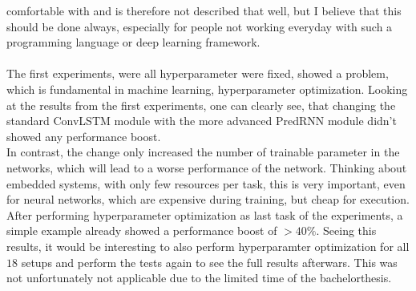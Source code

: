  comfortable with and is therefore not described that well, but I believe that this should be done always, especially for people not working everyday with such a 
 programming language or deep learning framework.
 \\\\
 The first experiments, were all hyperparameter were fixed, showed a problem, which is fundamental in machine learning, hyperparameter optimization. Looking at
 the results from the first experiments, one can clearly see, that changing the standard ConvLSTM module with the more advanced PredRNN module didn't
 showed any performance boost.\\In contrast, the change only increased the number of trainable parameter in the networks, which will lead to a worse performance
 of the network. Thinking about embedded systems, with only few resources per task, this is very important, even for neural networks, which are expensive during
 training, but cheap for execution. After performing hyperparameter optimization as last task of the experiments, a simple example already showed a performance
 boost of $> 40\%$. Seeing this results, it would be interesting to also perform hyperparamter optimization for all $18$ setups and perform the tests again to
 see the full results afterwars. This was not unfortunately not applicable due to the limited time of the bachelorthesis.